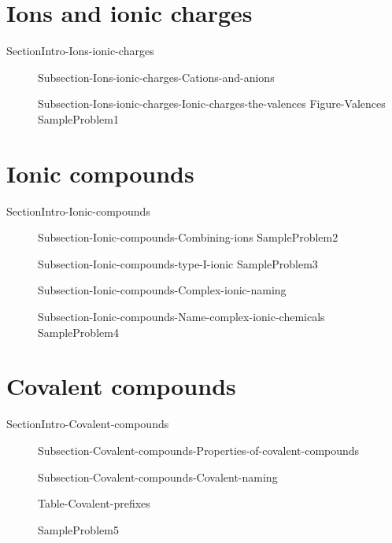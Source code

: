 \documentclass[main.tex]{subfiles}
\begin{document}
\section{Ions and ionic charges}
{SectionIntro-Ions-ionic-charges}
\sloppy\begin{description}
\item[]{Subsection-Ions-ionic-charges-Cations-and-anions}
\item[]{Subsection-Ions-ionic-charges-Ionic-charges-the-valences}
{Figure-Valences}
{SampleProblem1}
\end{description}


\section{Ionic compounds}
{SectionIntro-Ionic-compounds}
\sloppy \begin{description}
\item[]{Subsection-Ionic-compounds-Combining-ions}
{SampleProblem2}
\item[]{Subsection-Ionic-compounds-type-I-ionic}
{SampleProblem3}
\item[]{Subsection-Ionic-compounds-Complex-ionic-naming}
\item[]{Subsection-Ionic-compounds-Name-complex-ionic-chemicals}
{SampleProblem4}
\end{description}

\section{Covalent compounds}{SectionIntro-Covalent-compounds}
\sloppy \begin{description}
\item[]{Subsection-Covalent-compounds-Properties-of-covalent-compounds}
\item[]{Subsection-Covalent-compounds-Covalent-naming}
\begin{center} {Table-Covalent-prefixes}\end{center}	
{SampleProblem5}
\end{description}
\end{document}

